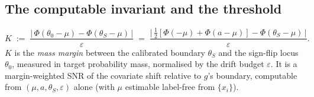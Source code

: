 \subsection{The computable invariant and the threshold}\label{sec:knowcap-K}
\begin{definition}\label{def:knowcap-K}
\[
  K \;:=\; \frac{\big|\,\Phi(\theta_0-\mu)-\Phi(\theta_S-\mu)\,\big|}{\varepsilon}
       \;=\; \frac{\big|\,\tfrac12[\Phi(-\mu)+\Phi(a-\mu)]-\Phi(\theta_S-\mu)\,\big|}{\varepsilon}.
\]
$K$ is the \emph{mass margin} between the calibrated boundary $\theta_S$ and the
sign-flip locus $\theta_0$, measured in target probability mass, normalised by the
drift budget $\varepsilon$. It is a margin-weighted SNR of the covariate shift
relative to $g$'s boundary, computable from $(\mu,a,\theta_S,\varepsilon)$ alone
(with $\mu$ estimable label-free from $\{x_i\}$).
\end{definition}

